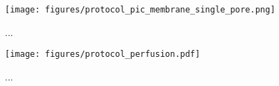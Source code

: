 \begin{figure}[h]
\begin{centering}
\texttt{[image: figures/protocol\_pic\_membrane\_single\_pore.png]}
\caption[Diagram of single nanopore capture]{...}
\label{fig:helicase_data}
\end{centering}
\end{figure}

\begin{figure}[h]
\begin{centering}
\texttt{[image: figures/protocol\_perfusion.pdf]}
\caption[Setup for removing nanopores by buffer perfusion]{...}
\label{fig:helicase_data}
\end{centering}
\end{figure}